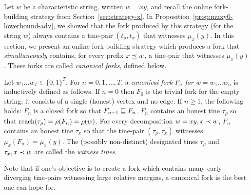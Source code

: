 





Let $w$ be a characteristic string, written $w = xy$, 
and recall the online fork-building strategy from Section~\ref{sec:strategy-x}. 
In Proposition~\ref{prop:muxy0-lowerbound-adv}, 
we showed that the fork produced by this strategy (for the string $w$) 
always contains a tine-pair $(t_\rho, t_x)$ that witnesses $\mu_x(y)$. 
In this section, we present an online fork-building strategy 
which produces a fork that \emph{simultaneously} contains, 
for every prefix $x \preceq w$, 
a tine-pair that witnesses $\mu_x(y)$. 
These forks are called \emph{canonical forks}, defined below.
\begin{definition}
	Let $w_1 \ldots w_T \in \{0,1\}^T$. 
	For $n = 0, 1, \ldots, T$, a \emph{canonical fork $F_n$ for $w = w_1\ldots w_n$} 
	is inductively defined as follows. 
	If $n = 0$ then $F_0$ is the trivial fork for the empty string; 
	it consists of a single (honest) vertex and no edge. 
	If $n \geq 1$, the following holds: 
	$F_n$ is a closed fork so that $F_{n-1} \sqsubseteq F_n$. 
	$F_n$ contains an honest tine $\tau_\rho$ so that 
	$\operatorname{reach}(\tau_\rho) = \rho(F_n) = \rho(w)$. 
	For every decomposition $w = xy, x \prec w$, 
	$F_n$ contains an honest tine $\tau_x$ 
	so that the tine-pair $(\tau_\rho, \tau_x)$ witnesses $\mu_x(F_n) = \mu_x(y)$. 
	The (possibly non-distinct) designated tines $\tau_\rho$ and $\tau_x, x \prec w$ 
	are called the \emph{witness tines}.
\end{definition}
Note that if one's objective is to create a fork 
which contains many early-diverging tine-pairs witnessing large relative margins, 
a canonical fork is the best one can hope for. 






